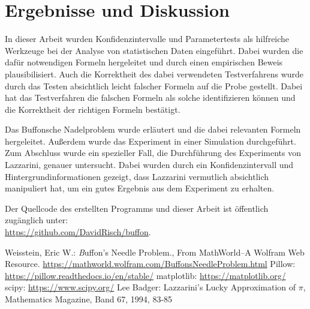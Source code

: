 \documentclass[10pt,twocolumn]{scrartcl}
\begin{document}
	
\section{Ergebnisse und Diskussion}
	In dieser Arbeit wurden Konfidenzintervalle und  Parametertests als hilfreiche Werkzeuge bei der Analyse von statistischen Daten eingeführt. Dabei wurden die dafür notwendigen Formeln hergeleitet und durch einen empirischen Beweis plausibilisiert.
	Auch die Korrektheit des dabei verwendeten Testverfahrens wurde durch das Testen absichtlich leicht falscher Formeln auf die Probe gestellt. Dabei hat das Testverfahren die falschen Formeln als solche identifizieren können und die Korrektheit der richtigen Formeln bestätigt.
	
	Das Buffonsche Nadelproblem wurde erläutert und die dabei relevanten Formeln hergeleitet. Außerdem wurde das Experiment in einer Simulation durchgeführt.
	Zum Abschluss wurde ein spezieller Fall, die Durchführung des Experiments von Lazzarini, genauer untersucht. Dabei wurden durch ein Konfidenzintervall und Hintergrundinformationen gezeigt, dass Lazzarini vermutlich absichtlich manipuliert hat, um ein gutes Ergebnis aus dem Experiment zu erhalten.
	
	\bigskip
	\noindent
	Der Quellcode des erstellten Programms und dieser Arbeit ist öffentlich zugänglich unter:\\ \url{https://github.com/DavidRisch/buffon}.

\newpage
\begin{thebibliography}{99}
	Weisstein, Eric W.: {\textit Buffon's Needle Problem.}, From MathWorld--A Wolfram Web Resource. \url{https://mathworld.wolfram.com/BuffonsNeedleProblem.html}
	Pillow: \url{https://pillow.readthedocs.io/en/stable/}
	matplotlib: \url{https://matplotlib.org/}
	scipy: \url{https://www.scipy.org/}
	Lee Badger: Lazzarini’s Lucky Approximation of $\pi$, Mathematics Magazine, Band 67, 1994, 83-85
\end{thebibliography}
\end{document}
